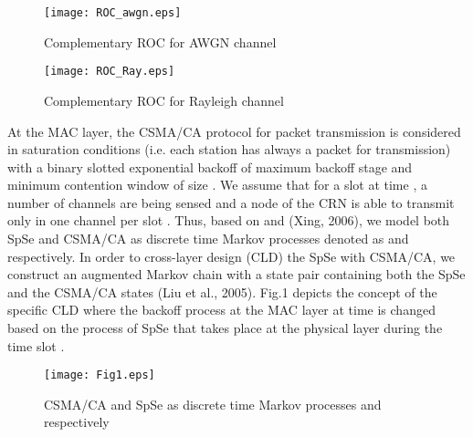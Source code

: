 \documentclass
[journal,11pt,draftclsnofoot,onecolumn,doublespace]{tETN2e}
\begin{document}
\begin{figure}
\centering
  \texttt{[image: ROC\_awgn.eps]}\\
  \caption{Complementary ROC for AWGN channel}
  \label{fig:ROC_awgn}
\end{figure}

\begin{figure}
\centering
  \texttt{[image: ROC\_Ray.eps]}\\
  \caption{Complementary ROC for Rayleigh channel}
  \label{fig:ROC_Ray}
\end{figure}

At the MAC layer, the CSMA/CA protocol for packet transmission is considered in saturation conditions (i.e. each station has always a packet for transmission) with a binary slotted exponential backoff of maximum backoff stage  and minimum contention window of size  \citep{bianchi00}. We assume that for a slot at time , a number of  channels are being sensed and a node of the CRN is able to transmit only in one channel per slot \citep{bianchi00}. Thus, based on \citep{bianchi00} and (Xing, 2006), we model both SpSe and CSMA/CA as discrete time Markov processes denoted as  and  respectively. In order to cross-layer design (CLD) the SpSe with CSMA/CA, we construct an augmented Markov chain with a state pair  containing both the SpSe and the CSMA/CA states (Liu et al., 2005). Fig.1 depicts the concept of the specific CLD where the backoff process  at the MAC layer at time  is changed based on the process of SpSe  that takes place at the physical layer during the time slot .
\begin{figure}
\centering
  \texttt{[image: Fig1.eps]}\\
  \caption{CSMA/CA and SpSe as discrete time Markov processes  and  respectively}
  \label{fig:systemmodel}
\end{figure}
\end{document}
